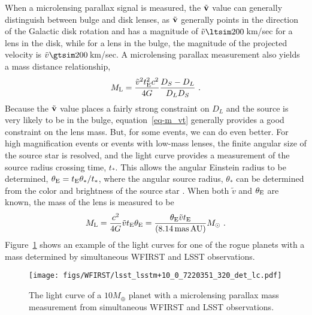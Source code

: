 When a microlensing parallax signal is measured, the $\tilde{\bf v}$ value
can generally distinguish between bulge and disk lenses, as $\tilde{\bf v}$
generally points in the direction of the Galactic disk rotation and has
a magnitude of $\tilde{v} \ltsim 200\,$km/sec for a lens in the
disk, while for a lens in the bulge, the magnitude of the projected velocity
is $\tilde{v} \gtsim 200\,$km/sec. A microlensing parallax measurement also
yields a mass distance relationship,
\begin{equation}
   M_{\rm L} = {\tilde{v}^2 t_{\rm E}^2 c^2 \over 4 G} {D_S-D_L \over D_L D_S} \ .
   \label{eq-m_vt}
\end{equation}
Because the $\tilde{\bf v}$ value places a fairly strong constraint
on $D_L$ and the source is very likely to be in the bulge, equation~\ref{eq-m_vt}
generally provides a good constraint on the lens mass. But, for some
events, we can do even better. For high magnification events or events
with low-mass lenses, the finite angular size of the source star is
resolved, and the light curve provides a measurement of the source
radius crossing time, $t_*$. This allows the angular Einstein radius
to be determined, $\theta_{\rm E} = t_{\rm E} \theta_*/t_*$, where the angular
source radius, $\theta_*$ can be determined from the color and brightness
of the source star \citep{2014AJ....147...47B}. When both $\tilde{v}$ and
$\theta_{\rm E}$ are known, the mass of the lens is measured to be
\begin{equation}
M_{\rm L} = {c^2\over 4G} \tilde{v} t_{\rm E} \theta_{\rm E} = {\theta_{\rm E}\tilde{v} t_{\rm E} \over (8.14\,{\rm mas\, AU})} M_{\odot} \ .
\label{eq-m}
\end{equation}
Figure~\ref{fig-lc} shows an example of the light curves for one of the
rogue planets with a mass determined by simultaneous WFIRST and LSST
observations.

\begin{figure}[t]
\centering\texttt{[image: figs/WFIRST/lsst\_lsstm+10\_0\_7220351\_320\_det\_lc.pdf]}
\caption{The light curve of a $10 M_{\oplus}$ planet with a microlensing parallax
mass measurement from simultaneous WFIRST and LSST observations.
\label{fig-lc}}
\end{figure}

